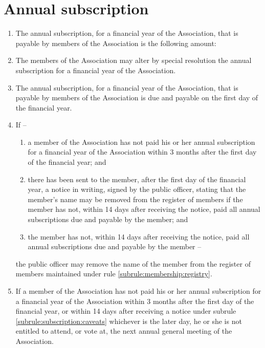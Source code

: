 \section{Annual subscription}
\label{rule:subscription}

\begin{enumerate}
	\item The annual subscription, for a financial year of the Association, that is payable by members of the Association is the following amount:\\\orgAnnualFee{}
	\item The members of the Association may alter by special resolution the annual subscription for a financial year of the Association.
	\item The annual subscription, for a financial year of the Association, that is payable by members of the Association is due and payable on the first day of the financial year.
	
	\item \label{subrule:subscription:caveats} If --
		\begin{enumerate}
			\item a member of the Association has not paid his or her annual subscription for a financial year of the Association within 3 months after the first day of the financial year; and
			\item there has been sent to the member, after the first day of the financial year, a notice in writing, signed by the public officer, stating that the member's name may be removed from the register of members if the member has not, within 14 days after receiving the notice, paid all annual subscriptions due and payable by the member; and
			\item the member has not, within 14 days after receiving the notice, paid all annual subscriptions due and payable by the member --
		\end{enumerate}	the public officer may remove the name of the member from the register of members maintained under rule \ref{subrule:membership:registry}.

	\item If a member of the Association has not paid his or her annual subscription for a financial year of the Association within 3 months after the first day of the financial year, or within 14 days after receiving a notice under subrule \ref{subrule:subscription:caveats} whichever is the later day, he or she is not entitled to attend, or vote at, the next annual general meeting of the Association.
\end{enumerate}